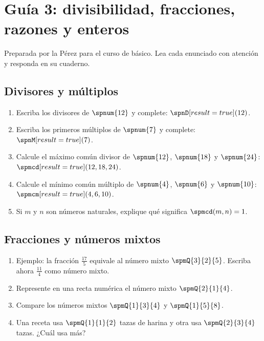 \documentclass{article}
\begin{document}
\section*{Guía  3: divisibilidad, fracciones, razones y enteros}

Preparada por la  Pérez para el curso de  básico.
Lea cada enunciado con atención y responda en su cuaderno.

\subsection*{Divisores y múltiplos}

\begin{enumerate}
  \item Escriba los divisores de $\spnum{12}$ y complete: $\spnD[result=true](12)$.
  \item Escriba los primeros múltiplos de $\spnum{7}$ y complete: $\spnM[result=true](7)$.
  \item Calcule el máximo común divisor de $\spnum{12}$, $\spnum{18}$ y $\spnum{24}$: $\spmcd[result=true](12, 18, 24)$.
  \item Calcule el mínimo común múltiplo de $\spnum{4}$, $\spnum{6}$ y $\spnum{10}$: $\spmcm[result=true](4, 6, 10)$.
  \item Si $m$ y $n$ son números naturales, explique qué significa $\spmcd(m, n) = 1$.
\end{enumerate}

\subsection*{Fracciones y números mixtos}

\begin{enumerate}
  \item Ejemplo: la fracción $\frac{17}{5}$ equivale al número mixto $\spmQ{3}{2}{5}$. Escriba ahora $\frac{11}{4}$ como número mixto.
  \item Represente en una recta numérica el número mixto $\spmQ{2}{1}{4}$.
  \item Compare los números mixtos $\spmQ{1}{3}{4}$ y $\spmQ{1}{5}{8}$.
  \item Una receta usa $\spmQ{1}{1}{2}$ tazas de harina y otra usa $\spmQ{2}{3}{4}$ tazas. ¿Cuál usa más?
\end{enumerate}
\end{document}
